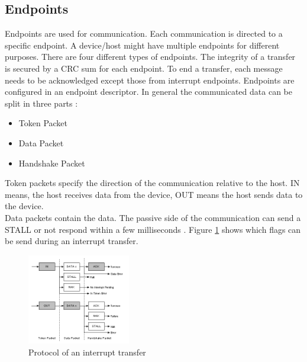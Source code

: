 \documentclass{acm_proc_article-sp}
\begin{document}
\subsection{Endpoints}
Endpoints are used for communication.
Each communication is directed to a specific endpoint.
A device/host might have multiple endpoints for different purposes.
There are four different types of endpoints.
The integrity of a transfer is secured by a CRC sum for each endpoint.
To end a transfer, each message needs to be acknowledged except those from interrupt endpoints.
Endpoints are configured in an endpoint descriptor.
In general the communicated data can be split in three parts \cite{beyond}:
\begin{itemize}
\item Token Packet
\item Data Packet
\item Handshake Packet
\end{itemize}
Token packets specify the direction of the communication relative to the host.
IN means, the host receives data from the device, OUT means the host sends data to the device.\\
Data packets contain the data.
The passive side of the communication can send a STALL or not respond within a few milliseconds
\cite{beyond}.
Figure \ref{fig:ifer} shows which flags can be send during an interrupt transfer.

\begin{figure}[!h]
\centering
\includegraphics[width=0.4\textwidth]{interrupttransfer.png}
\caption{Protocol of an interrupt transfer \cite{beyond}}
\label{fig:ifer}
\end{figure}
\end{document}

